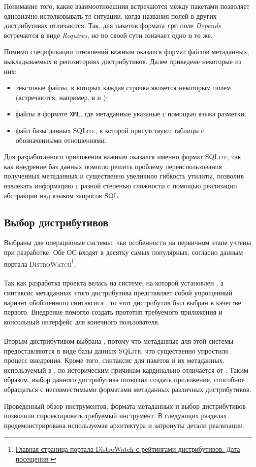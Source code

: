 Понимание того, какие взаимоотноешния встречаются между пакетами позволяет однозначно истолковывать те ситуации, когда названия полей в других дистрибутивах отличаются.
Так, для пакетов формата \texttt{rpm} поле \textit{Depends} встречается в виде \textit{Requires}, но по своей сути означает одно и то же.

Помимо спецификации отношений важным оказался формат файлов метаданных, выкладываемых в репозиториях дистрибутивов.
Далее приведене некоторые из них:
\begin{itemize}
	\item текстовые файлы, в которых каждая строчка является некоторым полем (встречаются, например, в {\debian} и {\ubuntu});
	\item файлы в формате \texttt{XML}, где метаданные указаные с помощью языка разметки;
	\item файл базы данных \textsc{SQLite}, в которой присутствуют таблицы с обозначенными отношениями.
\end{itemize}

Для разработанного приложения важным оказался именно формат \textsc{SQLite}, так как внедрение баз данных помогло решить проблему переиспользования полученных метаданных и существенно увеличило гибкость утилиты, позволив извлекать информацию с разной степенью сложности с помощью реализации абстракции над языком запросов \textsc{SQL}.

\subsection{Выбор дистрибутивов}
Выбраны две операционые системы, чьи особенности на первичном этапе учтены при разработке.
Обе ОС входят в десятку самых популярных, согласно данным портала \textsc{DistroWatch}\footnote{\href{https://distrowatch.com/}{Главная страница портала DistroWatch с рейтингами дистрибутивов. Дата посещения }}.

\paragraph{\ubuntu}
Так как разработка проекта велась на системе, на которой установлен {\ubuntu}, а синтаксис метаданных этого дистрибутива представляет собой упрощенный вариант обобщенного синтаксиса {\debian}, то этот дистрибутив был выбран в качестве первого.
Внедрение {\ubuntu} помогло создать прототип требуемого приложения и консольный интерфейс для конечного пользователя.

\paragraph{\fedora}
Вторым дистрибутивом выбрана {\fedora}, потому что метаданные для этой системы предоставляются в виде базы данных \textsc{SQLite}, что существенно упростило процесс внедрения.
Кроме того, синтаксис для пакетов и их метаданных, используемый в {\fedora}, по историческим причинам кардинально отличается от {\debian}. Таким образом, выбор данного дистрибутива позволил создать приложение, способное обращаться с несовместимыми форматами метаданных различных дистрибутивов.

Проведенный обзор инструментов, формата метаданных и выбор дистрибутивов позволили спроектировать требуемый инструмент.
В следующих разделах продемонстрирована используемая архитектура и затронуты детали реализации.
